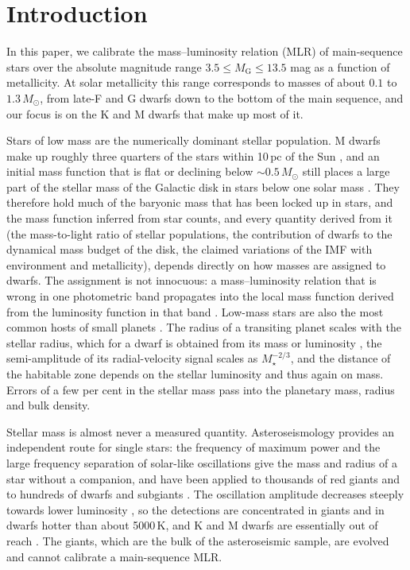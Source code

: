 \documentclass{aa}
\newcommand{\msun}{M_{\odot}}
\begin{document}
\section{Introduction}\label{sec:intro}

In this paper, we calibrate the mass--luminosity relation (MLR) of main-sequence stars over the absolute magnitude range $3.5\le M_{\mathrm{G}}\le13.5$ mag as a function of metallicity. At solar metallicity this range corresponds to masses of about $0.1$ to $1.3\,\msun$, from late-F and G dwarfs down to the bottom of the main sequence, and our focus is on the K and M dwarfs that make up most of it.

Stars of low mass are the numerically dominant stellar population. M dwarfs make up roughly three quarters of the stars within 10\,pc of the Sun \citep{Henry2018}, and an initial mass function that is flat or declining below $\sim0.5\,\msun$ \citep{Kroupa2001,Chabrier2003} still places a large part of the stellar mass of the Galactic disk in stars below one solar mass \citep{Chabrier2001}. They therefore hold much of the baryonic mass that has been locked up in stars, and the mass function inferred from star counts, and every quantity derived from it (the mass-to-light ratio of stellar populations, the contribution of dwarfs to the dynamical mass budget of the disk, the claimed variations of the IMF with environment and metallicity), depends directly on how masses are assigned to dwarfs. The assignment is not innocuous: a mass--luminosity relation that is wrong in one photometric band propagates into the local mass function derived from the luminosity function in that band \citep{Delfosse2000}. Low-mass stars are also the most common hosts of small planets \citep{Dressing2015}. The radius of a transiting planet scales with the stellar radius, which for a dwarf is obtained from its mass or luminosity \citep{Mann2015}, the semi-amplitude of its radial-velocity signal scales as $M_\star^{-2/3}$, and the distance of the habitable zone depends on the stellar luminosity and thus again on mass. Errors of a few per cent in the stellar mass pass into the planetary mass, radius and bulk density.

Stellar mass is almost never a measured quantity. Asteroseismology provides an independent route for single stars: the frequency of maximum power and the large frequency separation of solar-like oscillations give the mass and radius of a star without a companion, and have been applied to thousands of red giants and to hundreds of dwarfs and subgiants \citep{ChaplinMiglio2013,Serenelli2017,Pinsonneault2018}. The oscillation amplitude decreases steeply towards lower luminosity \citep{Kjeldsen1995}, so the detections are concentrated in giants and in dwarfs hotter than about 5000\,K, and K and M dwarfs are essentially out of reach \citep{ChaplinMiglio2013}. The giants, which are the bulk of the asteroseismic sample, are evolved and cannot calibrate a main-sequence MLR.
\end{document}
